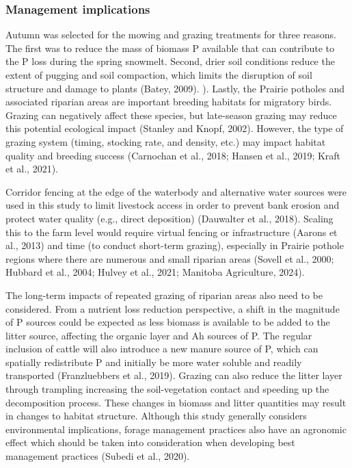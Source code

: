 \documentclass[
]{agujournal2019}
\begin{document}
\subsubsection{Management implications}\label{management-implications}

Autumn was selected for the mowing and grazing treatments for three
reasons. The first was to reduce the mass of biomass P available that
can contribute to the P loss during the spring snowmelt. Second, drier
soil conditions reduce the extent of pugging and soil compaction, which
limits the disruption of soil structure and damage to plants (Batey,
2009). ). Lastly, the Prairie potholes and associated riparian areas are
important breeding habitats for migratory birds. Grazing can negatively
affect these species, but late-season grazing may reduce this potential
ecological impact (Stanley and Knopf, 2002). However, the type of
grazing system (timing, stocking rate, and density, etc.) may impact
habitat quality and breeding success (Carnochan et al., 2018; Hansen et
al., 2019; Kraft et al., 2021).

Corridor fencing at the edge of the waterbody and alternative water
sources were used in this study to limit livestock access in order to
prevent bank erosion and protect water quality (e.g., direct deposition)
(Dauwalter et al., 2018). Scaling this to the farm level would require
virtual fencing or infrastructure (Aarons et al., 2013) and time (to
conduct short-term grazing), especially in Prairie pothole regions where
there are numerous and small riparian areas (Sovell et al., 2000;
Hubbard et al., 2004; Hulvey et al., 2021; Manitoba Agriculture, 2024).

The long-term impacts of repeated grazing of riparian areas also need to
be considered. From a nutrient loss reduction perspective, a shift in
the magnitude of P sources could be expected as less biomass is
available to be added to the litter source, affecting the organic layer
and Ah sources of P. The regular inclusion of cattle will also introduce
a new manure source of P, which can spatially redistribute P and
initially be more water soluble and readily transported (Franzluebbers
et al., 2019). Grazing can also reduce the litter layer through
trampling increasing the soil-vegetation contact and speeding up the
decomposition process. These changes in biomass and litter quantities
may result in changes to habitat structure. Although this study
generally considers environmental implications, forage management
practices also have an agronomic effect which should be taken into
consideration when developing best management practices (Subedi et al.,
2020).
\end{document}
